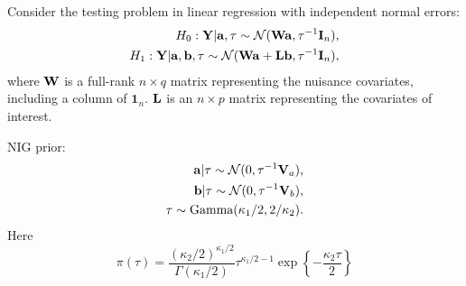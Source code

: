 \documentclass[11pt]{article}
\newcommand{\Ba}{\mathbf{a}}    \newcommand{\Bb}{\mathbf{b}}    \newcommand{\Bc}{\mathbf{c}}    \newcommand{\Bd}{\mathbf{d}}    \newcommand{\Be}{\mathbf{e}}    \newcommand{\Bf}{\mathbf{f}}    \newcommand{\Bg}{\mathbf{g}}    \newcommand{\Bh}{\mathbf{h}}    \newcommand{\Bi}{\mathbf{i}}    \newcommand{\Bj}{\mathbf{j}}    \newcommand{\Bk}{\mathbf{k}}    \newcommand{\Bl}{\mathbf{l}}
\newcommand{\BY}{\mathbf{Y}}    \newcommand{\BZ}{\mathbf{Z}}
\theoremstyle{plain}
\theoremstyle{definition}
\theoremstyle{remark}
\begin{document}
Consider the testing problem in linear regression with independent normal errors:
\begin{equation*}
    \begin{split}
    H_0:
    \BY|\Ba,\tau \sim \mathcal N (\BW \Ba,\tau^{-1}\BI_n),
    \\
    H_1:
    \BY|\Ba,\Bb, \tau \sim \mathcal N (\BW \Ba + \BL \Bb, \tau^{-1} \BI_n),
    \end{split}
\end{equation*}
where $\mathbf{W}$ is a full-rank $n\times q$ matrix representing the nuisance covariates, including a column of $\mathbf 1_n$.
$\mathbf{L}$ is an $n\times p$ matrix representing the covariates of interest.

NIG prior:
\begin{equation*}
    \begin{split}
        \Ba | \tau \sim \mathcal N (0, \tau^{-1} \BV_a),
        \\
        \Bb | \tau \sim \mathcal N (0, \tau^{-1} \BV_b),
        \\
        \tau \sim \text{Gamma} (\kappa_1/2,2/\kappa_2)
        .
    \end{split}
\end{equation*}
Here
\begin{equation*}
        \pi(\tau) =\frac{(\kappa_2/2)^{\kappa_1/2}}{\Gamma (\kappa_1/2)}
        \tau^{\kappa_1/2-1} \exp\left\{-\frac{\kappa_2 \tau}{2}\right\}
\end{equation*}
\end{document}
